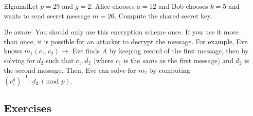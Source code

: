 \begin{example}
    {Elgamal}Let \(p = 29\) and \(g = 2\). Alice chooses \(a = 12\) and Bob chooses \(k = 5\) and wants to send secret message \(m = 26\). Compute the shared secret key.
\end{example}


\begin{note}
    Be aware: You should only use this encryption scheme once. If you use it more than once, it is possible for an attacker to decrypt the message. For example, Eve knows \(m_1(c_1, c_2) \rightarrow\) Eve finds \(A\) by keeping record of the first message, then by solving for \(d_2\) such that \(c_1, d_2\) (where \(c_1\) is the \textit{same} as the first message) and \(d_2\) is the second message. Then, Eve can solve for \(m_2\) by computing \({(c_1^d)}^{-1} \cdot d_2 \ (\text{mod } p)\).
\end{note}



\renewcommand{\theenumi}{\alph{enumi}}
\renewcommand{\labelenumi}{(\theenumi)}
\subsection{Exercises}

